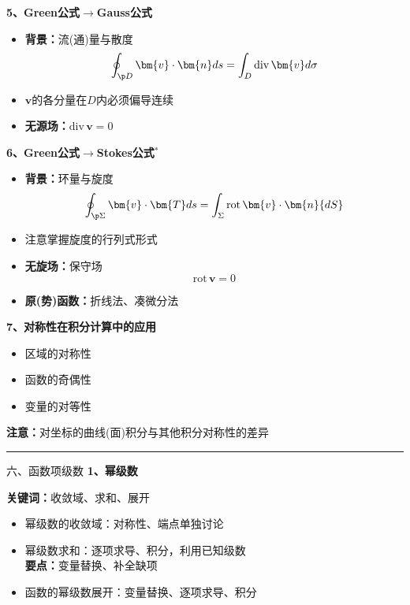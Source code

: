 \begin{frame}
	\linespread{1.2}
	{\bf 5、Green公式$\to$Gauss公式}\pause 
	\begin{itemize}
	  \item {\bf 背景：}流(通)量与散度\pause 
	  $$\oint_{\p D}\bm{v}\cdot\bm{n}ds=
	  \int_D{\mathrm{div}\,\bm{v}}{d\sigma}$$\pause 
	  \item {}\alert{$\bm{v}$的各分量在$D$内必须偏导连续}\pause 
	  \item {\bf 无源场：}$\mathrm{div}\,\bm{v}=0$
	\end{itemize}
\end{frame}

\begin{frame}
	\linespread{1.2}
	{\bf 6、Green公式$\to$Stokes公式$^*$}\pause 
	\begin{itemize}
	  \item {\bf 背景：}环量与旋度\pause 
	  $$\oint_{\p\Sigma}\bm{v}\cdot\bm{T}ds=
	  \int_{\Sigma}{\mathrm{rot}\,\bm{v}}\cdot\bm{n}{dS}$$\pause 
	  \item \alert{注意掌握旋度的行列式形式}\pause 
	  \item {\bf 无旋场：}保守场
	  $$\mathrm{rot}\,\bm{v}=0$$\pause 
	  \item {\bf 原(势)函数：}折线法、凑微分法
	\end{itemize}
\end{frame}

\begin{frame}
	\linespread{1.5}
	{\bf 7、对称性在积分计算中的应用}\pause 
	  \begin{itemize}
		\item 区域的对称性\pause 
		\item 函数的奇偶性\pause 
		\item 变量的对等性\pause 
	  
	  \end{itemize}
	  {\bf 注意：}对坐标的曲线(面)积分与其他积分对称性的差异\pause 
	  \vspace{1em}
	\hrule
	\bigskip
	\centerline{}
\end{frame}

\begin{frame}{六、函数项级数}
	\linespread{1.2}\pause 
	{\bf 1、幂级数}\pause 
	
	{\b{\bf 关键词：}\pause 收敛域、\pause 求和、\pause 展开}\pause 
	\begin{itemize}
	  \item 幂级数的收敛域：\pause 对称性、\pause 端点单独讨论\pause 
	  \item 幂级数求和：\pause 逐项求导、积分，利用已知级数\pause \\
	  {\bf 要点：}\pause 变量替换、\pause 补全缺项\pause 
	  \item 函数的幂级数展开：\pause 变量替换、逐项求导、积分
	\end{itemize}
\end{frame}

